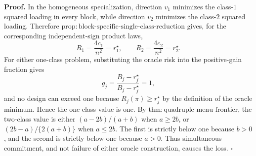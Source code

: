 \textbf{Proof.}
In the homogeneous specialization, direction \(v_1\) minimizes the class-\(1\) squared loading in every block, while direction \(v_2\) minimizes the class-\(2\) squared loading.  Therefore \(\mathrm{prop:block\text{-}specific\text{-}single\text{-}class\text{-}reduction}\) gives, for the corresponding independent-sign product laws,
\[
R_1=\frac{4c_1}{n^2}=r_1^\star,
\qquad
R_2=\frac{4c_2}{n^2}=r_2^\star.
\]
For either one-class problem, substituting the oracle risk into the positive-gain fraction gives
\[
g_j=\frac{B_j-r_j^\star}{B_j-r_j^\star}=1,
\]
and no design can exceed one because \(R_j(\pi)\ge r_j^\star\) by the definition of the oracle minimum. Hence the one-class value is one.  By \(\mathrm{thm:quadruple\text{-}menu\text{-}frontier}\), the two-class value is either \((a-2b)/(a+b)\) when \(a\ge2b\), or \((2b-a)/\{2(a+b)\}\) when \(a\le2b\).  The first is strictly below one because \(b>0\), and the second is strictly below one because \(a>0\).  Thus simultaneous commitment, and not failure of either oracle construction, causes the loss. \(\square\)